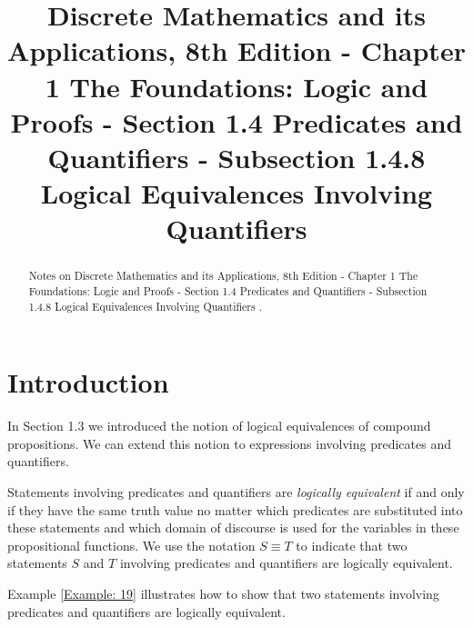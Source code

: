 \documentclass{Axon}
\title{Discrete Mathematics and its Applications, 8th Edition - Chapter 1 The Foundations: Logic and Proofs - Section 1.4 Predicates and Quantifiers - Subsection 1.4.8 Logical Equivalences Involving Quantifiers}
\begin{document}
\maketitle
\makeauthor
\begin{abstract}
Notes on Discrete Mathematics and its Applications, 8th Edition - Chapter 1 The Foundations: Logic and Proofs - Section 1.4 Predicates and Quantifiers - Subsection 1.4.8 Logical Equivalences Involving Quantifiers \cite{Rosen}.
\end{abstract}
\section{Introduction}
In Section 1.3 we introduced the notion of logical equivalences of compound propositions. We can extend this notion to expressions involving predicates and quantifiers.

\begin{definition}
    Statements involving predicates and quantifiers are \textit{logically equivalent} if and only if they have the same truth value no matter which predicates are substituted into these statements and which domain of discourse is used for the variables in these propositional functions. We use the notation \(S \equiv T\) to indicate that two statements \(S\) and \(T\) involving predicates and quantifiers are logically equivalent.
\end{definition}

Example \ref{Example: 19} illustrates how to show that two statements involving predicates and quantifiers are logically equivalent.
\end{document}
